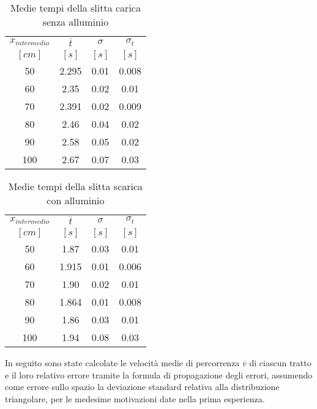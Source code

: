 \documentclass[a4paper,11pt,oneside]{article}
\begin{document}
\begin{table}[h!]%
\centering
\begin{tabular}{c|ccc}
\toprule
$x_{intermedio}$&$\overline{t}$&$\sigma$&$\sigma_{\overline{t}}$\\
$[\si{cm}]$&$[\si{s}]$&$[\si{s}]$&$[\si{s}]$\\
\midrule
50	&2.295 	&0.01	&0.008\\
60	&2.35	&0.02	&0.01\\
70	&2.391	&0.02	&0.009\\
80	&2.46     &0.04	&0.02\\
90  &2.58	&0.05	&0.02\\
100	&2.67	&0.07	&0.03\\
\bottomrule
\end{tabular}
    \caption{Medie tempi della slitta carica senza alluminio}
    \label{tab:sm_na}
\end{table}

\begin{table}[h!]%
\centering
\begin{tabular}{c|ccc}
\toprule
$x_{intermedio}$&$\overline{t}$&$\sigma$&$\sigma_{\overline{t}}$\\
$[\si{cm}]$&$[\si{s}]$&$[\si{s}]$&$[\si{s}]$\\
\midrule
50	&1.87	&0.03	&0.01\\
60	&1.915	&0.01	&0.006\\
70	&1.90	&0.02	&0.01\\
80	&1.864	&0.01	&0.008\\
90	&1.86	&0.03	&0.01\\
100	&1.94	    &0.08	&0.03\\
\bottomrule
\end{tabular}
    \caption{Medie tempi della slitta scarica con alluminio}
    \label{tab:nm_sa}
\end{table}


In seguito sono state calcolate le velocità medie di percorrenza $\overline{v}$ di ciascun tratto e il loro relativo errore tramite la formula di propagazione degli errori, assumendo come errore sullo spazio la deviazione standard relativa alla distribuzione triangolare, per le medesime motivazioni date nella prima esperienza.\\
\end{document}
